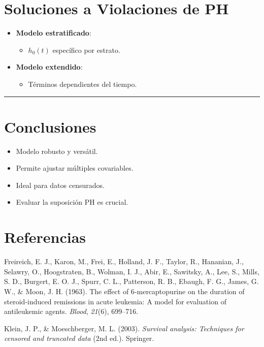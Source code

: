 \documentclass[
]{article}
\newlength{\cslhangindent}
\newenvironment{CSLReferences}[2] %
 {\begin{list}{}{%
  \setlength{\itemindent}{0pt}
  \setlength{\leftmargin}{0pt}
  \setlength{\parsep}{0pt}
  \ifodd #1
   \setlength{\leftmargin}{\cslhangindent}
   \setlength{\itemindent}{-1\cslhangindent}
  \fi
  \setlength{\itemsep}{#2\baselineskip}}}
 {\end{list}}
\providecommand{\tightlist}{%
  \setlength{\itemsep}{0pt}\setlength{\parskip}{0pt}}
\begin{document}
\section{Soluciones a Violaciones de
PH}\label{soluciones-a-violaciones-de-ph}

\begin{itemize}
\tightlist
\item
  \textbf{Modelo estratificado}:

  \begin{itemize}
  \tightlist
  \item
    \(h_0(t)\) específico por estrato.
  \end{itemize}
\item
  \textbf{Modelo extendido}:

  \begin{itemize}
  \tightlist
  \item
    Términos dependientes del tiempo.
  \end{itemize}
\end{itemize}

\begin{center}\rule{0.5\linewidth}{0.5pt}\end{center}

\section{Conclusiones}\label{conclusiones}

\begin{itemize}
\tightlist
\item
  Modelo robusto y versátil.
\item
  Permite ajustar múltiples covariables.
\item
  Ideal para datos censurados.
\item
  Evaluar la suposición PH es crucial.
\end{itemize}

\section{Referencias}\label{referencias}

\label{refs}
\begin{CSLReferences}{1}{0}
Freireich, E. J., Karon, M., Frei, E., Holland, J. F., Taylor, R.,
Hananian, J., Selawry, O., Hoogstraten, B., Wolman, I. J., Abir, E.,
Sawitsky, A., Lee, S., Mills, S. D., Burgert, E. O. J., Spurr, C. L.,
Patterson, R. B., Ebaugh, F. G., James, G. W., \& Moon, J. H. (1963).
The effect of 6‑mercaptopurine on the duration of steroid‑induced
remissions in acute leukemia: A model for evaluation of antileukemic
agents. \emph{Blood}, \emph{21}(6), 699--716.

Klein, J. P., \& Moeschberger, M. L. (2003). \emph{Survival analysis:
Techniques for censored and truncated data} (2nd ed.). Springer.

\end{CSLReferences}
\end{document}

